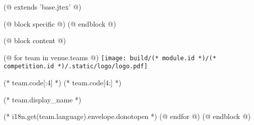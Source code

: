 (@ extends 'base.jtex' @)

(@ block specific @)
    \geometry{paper=c5paper, landscape}
(@ endblock @)

(@ block content @)
    \pagestyle{empty}
    \centering

    (@ for team in venue.teams @)
        \texttt{[image: build/(* module.id *)/(* competition.id *)/.static/logo/logo.pdf]}%
        \vspace*{5mm}

        \fontsize{60}{0}\selectfont%
        (* team.code[:4] *)%
        \fontsize{80}{0}\selectfont%
        (* team.code[4:] *)%

        \vspace{5mm}
        \fontsize{15}{0}\selectfont
        (* team.display_name *)

        \vspace{15mm}
        \normalsize
        (* i18n.get(team.language).envelope.donotopen *)
        \newpage
    (@ endfor @)
(@ endblock @)
